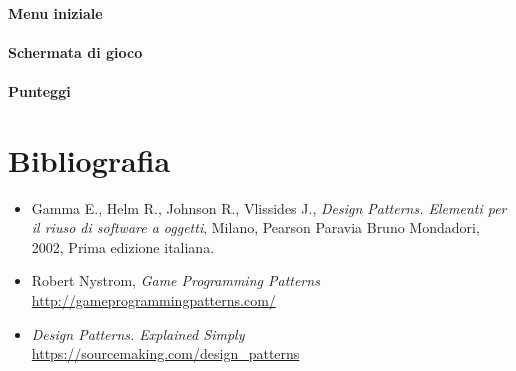 \documentclass[a4paper,12pt, hidelinks]{report}
\begin{document}
\subsubsection{Menu iniziale}

\subsubsection{Schermata di gioco}

\subsubsection{Punteggi}

\chapter{Bibliografia}

\begin{itemize}
	\item Gamma E., Helm R., Johnson R., Vlissides J., \emph{Design Patterns. Elementi per il riuso di software a oggetti}, Milano, Pearson Paravia Bruno Mondadori, 2002, Prima edizione italiana.
	\item Robert Nystrom, \emph{Game Programming Patterns} \href{http://gameprogrammingpatterns.com/}{http://gameprogrammingpatterns.com/}
	\item \emph{Design Patterns. Explained Simply} \href{https://sourcemaking.com/design\_patterns}{https://sourcemaking.com/design\_patterns}

\end{itemize}
\end{document}
